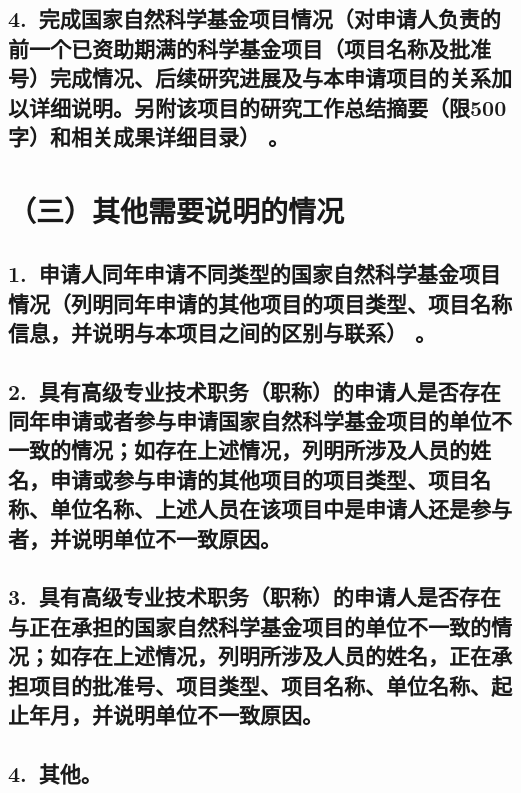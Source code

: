 \documentclass[12pt,UTF8,AutoFakeBold=2.5,a4paper]{ctexart} %
\begin{document}
{}

\subsection{\hspace{1.45em}  4.~{\bfseries 完成国家自然科学基金项目情况}（对申请人负责的前一个已资助期满的科学基金项目（项目名称及批准号）完成情况、后续研究进展及与本申请项目的关系加以详细说明。另附该项目的研究工作总结摘要（限500字）和相关成果详细目录）\hspace{-14pt} 。}

{}


\section{{\bfseries （三）其他需要说明的情况}} %
\subsection{\hspace{1.45em}  1.~申请人同年申请不同类型的国家自然科学基金项目情况（列明同年申请的其他项目的项目类型、项目名称信息，并说明与本项目之间的区别与联系）\hspace{-14pt} 。}


{}

\subsection{\hspace{1.45em}  2.~具有高级专业技术职务（职称）的申请人是否存在同年申请或者参与申请国家自然科学基金项目的单位不一致的情况；如存在上述情况，列明所涉及人员的姓名，申请或参与申请的其他项目的项目类型、项目名称、单位名称、上述人员在该项目中是申请人还是参与者，并说明单位不一致原因。}

{}

\subsection{\hspace{1.45em}  3.~具有高级专业技术职务（职称）的申请人是否存在与正在承担的国家自然科学基金项目的单位不一致的情况；如存在上述情况，列明所涉及人员的姓名，正在承担项目的批准号、项目类型、项目名称、单位名称、起止年月，并说明单位不一致原因。}

{}

\subsection{\hspace{1.45em}  4.~其他。}

{}

\clearpage
\end{document}

